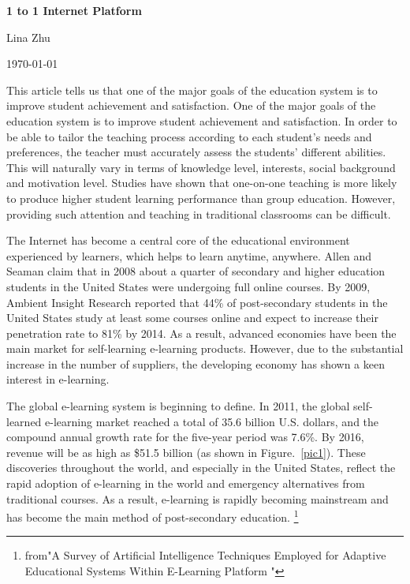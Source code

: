 \documentclass[a4paper,12pt,twocolumn]{article}
\begin{document}
\begin{center}
	
	\textbf{\bfseries \LARGE 1 to 1 Internet Platform} 
\end{center}
\begin{center}
	Lina Zhu
\end{center}
\begin{center}
	\today
\end{center}

	\par 	This article tells us that one of the major goals of the education system is to improve student achievement and satisfaction. One of the major goals of the education system is to improve student achievement and satisfaction. In order to be able to tailor the teaching process according to each student's needs and preferences, the teacher must accurately assess the students' different abilities. This will naturally vary in terms of knowledge level, interests, social background and motivation level. Studies have shown that one-on-one teaching is more likely to produce higher student learning performance than group education. However, providing such attention and teaching in traditional classrooms can be difficult.
	\par The Internet has become a central core of the educational environment experienced by learners, which helps to learn anytime, anywhere. Allen and Seaman claim that in 2008 about a quarter of secondary and higher education students in the United States were undergoing full online courses. By 2009, Ambient Insight Research reported that 44\% of post-secondary students in the United States study at least some courses online and expect to increase their penetration rate to 81\% by 2014. As a result, advanced economies have been the main market for self-learning e-learning products. However, due to the substantial increase in the number of suppliers, the developing economy has shown a keen interest in e-learning.
	\par The global e-learning system is beginning to define. In 2011, the global self-learned e-learning market reached a total of 35.6 billion U.S. dollars, and the compound annual growth rate for the five-year period was 7.6\%. By 2016, revenue will be as high as \$51.5 billion (as shown in Figure.~\ref{pic1}). These discoveries throughout the world, and especially in the United States, reflect the rapid adoption of e-learning in the world and emergency alternatives from traditional courses. As a result, e-learning is rapidly becoming mainstream and has become the main method of post-secondary education.
	\footnote{from"A Survey of Artificial Intelligence Techniques Employed for   Adaptive Educational  Systems Within E-Learning Platform	"} 
\end{document}
